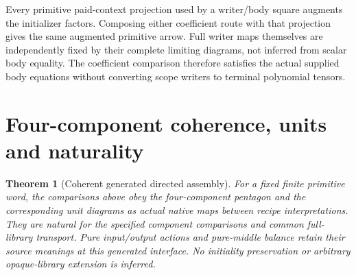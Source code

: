 \documentclass[11pt]{article}
\newtheorem{theorem}{Theorem}\newtheorem{definition}[theorem]{Definition}
\begin{document}
Every primitive paid-context projection used by a writer/body square augments the initializer factors. Composing either coefficient route with that projection gives the same augmented primitive arrow. Full writer maps themselves are independently fixed by their complete limiting diagrams, not inferred from scalar body equality. The coefficient comparison therefore satisfies the actual supplied body equations without converting scope writers to terminal polynomial tensors.

\section{Four-component coherence, units and naturality}
\begin{theorem}[Coherent generated directed assembly]
For a fixed finite primitive word, the comparisons above obey the four-component pentagon and the corresponding unit diagrams as actual native maps between recipe interpretations. They are natural for the specified component comparisons and common full-library transport. Pure input/output actions and pure-middle balance retain their source meanings at this generated interface. No initiality preservation or arbitrary opaque-library extension is inferred.
\end{theorem}
\end{document}
